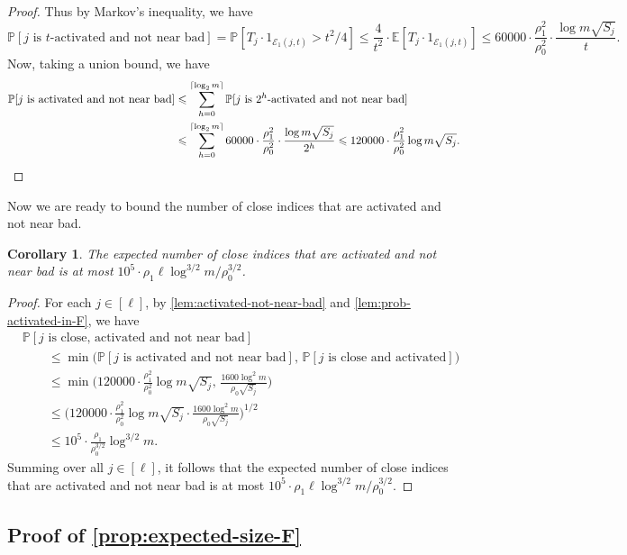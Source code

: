 \documentclass[reqno]{amsart}
\newtheorem{corollary}[theorem]{Corollary}
\theoremstyle{remark}
\theoremstyle{definition}
\numberwithin{theorem}{section}
\renewcommand{\(}{\bigl(}
\renewcommand{\)}{\bigr)\vphantom{)}}
\newcommand{\cE}{\mathcal E}
\newcommand{\E}{\mathbb{E}}
\renewcommand{\le}{\leqslant}
\renewcommand{\P}{\mathbb{P}}
\newcommand{\ceil}[1]{\lceil#1\rceil}
\begin{document}
\begin{proof}
    Thus by Markov's inequality, we have
    \[
        \P[j\text{ is $t$-activated and not near bad}] = \P[T_j\cdot 1_{\cE_1(j,t)} > t^2/4]\le \frac{4}{t^2}\cdot \E[T_j\cdot 1_{\cE_1(j,t)}]\le 60000\cdot\frac{\rho_1^2}{\rho_0^2}\cdot \frac{\log m\sqrt{S_j}}{t}.
    \]
     Now, taking a union bound, we have
    \begin{align*}
        \P[j\text{ is activated and not near bad}] &\le \sum_{h = 0}^{\ceil{\log_2 m}} \P[j\text{ is $2^h$-activated and not near bad}]\\
        &\le \sum_{h = 0}^{\ceil{\log_2 m}} 60000 \cdot\frac{\rho_1^2}{\rho_0^2}\cdot \frac{\log m\sqrt{S_j}}{2^h}
        \le 120000\cdot \frac{\rho_1^2}{\rho_0^2}\log m \sqrt{S_j}. \qedhere
    \end{align*}
\end{proof}

Now we are ready to bound the number of close indices that are activated and not near bad.

\begin{corollary}\label{cor:not-near-bad-in-F}
    The expected number of close indices that are activated and not near bad is at most $10^5\cdot \rho_1\ell\log^{3/2} m/\rho_0^{3/2}$.
\end{corollary}


\begin{proof}
    For each $j\in [\ell]$, by \cref{lem:activated-not-near-bad} and \cref{lem:prob-activated-in-F}, we have
    \begin{align*}
        &\P[j\text{ is close, activated and not near bad}]\\
        &\qquad\le \min \Big(\P[j\text{ is activated and not near bad}],\, \P[j\text{ is close and activated}]\Big)\\
        &\qquad\le \min \Big(120000\cdot \frac{\rho_1^2}{\rho_0^2}\log m \sqrt{S_j},\, \frac{1600\log^2 m}{\rho_0\sqrt{S_j}}\Big)\\
        &\qquad\le \Big(120000\cdot \frac{\rho_1^2}{\rho_0^2}\log m \sqrt{S_j}\cdot \frac{1600\log^2 m}{\rho_0\sqrt{S_j}}\Big)^{1/2}\\
        &\qquad\le 10^5\cdot \frac{\rho_1}{\rho_0^{3/2}}\log^{3/2} m.
    \end{align*}
    Summing over all $j\in [\ell]$, it follows that the expected number of close indices that are activated and not near bad is at most $10^5\cdot \rho_1\ell\log^{3/2} m/\rho_0^{3/2}$.
\end{proof}

\subsection{Proof of \cref{prop:expected-size-F}}
\end{document}
